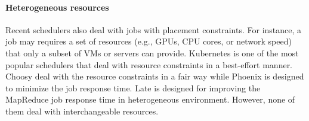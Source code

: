 \paragraph{Heterogeneous resources}
Recent schedulers also deal with jobs with placement constraints. %
For instance, a job may requires a set of resources (e.g., GPUs, CPU cores, or network speed) that only a subset of VMs or servers can provide.
Kubernetes \cite{kubernetes} is one of the most popular schedulers that deal with resource constraints in a best-effort manner. 
Choosy \cite{choosy} deal with the resource constraints in a fair way while Phoenix \cite{phoenix} is designed to minimize the job response time.
Late \cite{late} is designed for improving the MapReduce job response time in heterogeneous environment.
However, none of them deal with interchangeable resources.%




